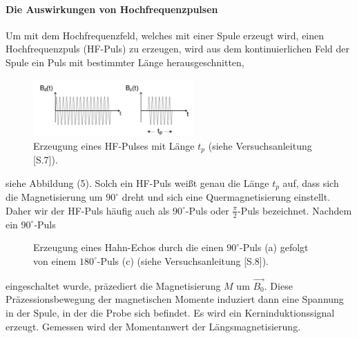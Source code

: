 \paragraph{Die Auswirkungen von Hochfrequenzpulsen}
Um mit dem Hochfrequenzfeld, welches mit einer Spule erzeugt wird, einen Hochfrequenzpuls (HF-Puls) zu erzeugen, wird aus dem kontinuierlichen Feld der Spule ein Puls mit bestimmter L\"{a}nge herausgeschnitten,  
\setcounter{figure}{3}
\begin{figure}[hbtp]
	\centering
	\vspace{-10pt}
	\caption{Erzeugung eines HF-Pulses mit L\"{a}nge $t_p$ (siehe Versuchsanleitung \cite{Anleitung}[S.7]).}
	\includegraphics[width=0.55\textwidth]{Plots/HFPuls.png} 
\end{figure}
siehe Abbildung (5).
Solch ein HF-Puls wei{\ss}t genau die L\"{a}nge $t_p$ auf, dass sich die Magnetisierung um $90^{\circ}$ dreht und sich eine Quermagnetisierung einstellt.
Daher wir der HF-Puls h\"{a}ufig auch als $90^{\circ}$-Puls oder $\frac{\pi}{2}$-Puls bezeichnet.
Nachdem ein $90^{\circ}$-Puls 
\begin{figure}
	\vspace{-5pt}
	\centering
	\caption{Erzeugung eines Hahn-Echos durch die einen $90^{\circ}$-Puls (a) gefolgt von einem $180^{\circ}$-Puls (c) (siehe Versuchsanleitung \cite{Anleitung}[S.8]).}
	\label{HahnEcho}
\end{figure}
eingeschaltet wurde, pr\"{a}zediert die Magneti{\-}sie{\-}rung $M$ um $\overrightarrow{B_0}$.
Diese Pr\"{a}zessionsbewe{\-}gung der magnetischen Momente induziert dann eine Spannung in der Spule, in der die Probe sich befindet.
Es wird ein Kerninduktionssignal erzeugt.
Gemessen wird der Momentanwert der L\"{a}ngsmagnetisierung.
